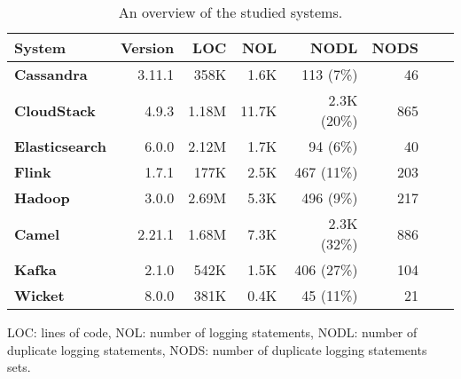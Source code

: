 \begin{table}
    \caption{An overview of the studied systems. }
    \vspace{-0.2cm}
    \centering
    \tabcolsep=6pt
    \begin{tabular}{lrrrrrrr}
        \toprule
        \textbf{System}& \textbf{Version}  & \textbf{LOC} & \textbf{NOL} &
        \textbf{NODL} & \textbf{NODS} \\
        \midrule
        \textbf{Cassandra} & 3.11.1  & 358K & 1.6K &  113 (7\%)& 46 \\
        \textbf{CloudStack} & 4.9.3  & 1.18M & 11.7K &  2.3K (20\%)& 865 \\
        \textbf{Elasticsearch} & 6.0.0  & 2.12M & 1.7K & 94 (6\%)& 40 \\
        \textbf{Flink} & 1.7.1  & 177K & 2.5K &  467 (11\%)& 203 \\
        \textbf{Hadoop} & 3.0.0  & 2.69M & 5.3K & 496 (9\%)& 217 \\

        \midrule
        \textbf{Camel} & 2.21.1  & 1.68M & 7.3K &  2.3K (32\%)& 886 \\
        \textbf{Kafka} & 2.1.0  & 542K & 1.5K &  406 (27\%)& 104 \\
        \textbf{Wicket} & 8.0.0 & 381K & 0.4K &  45 (11\%)& 21 \\
        \bottomrule
    \end{tabular}

    \noindent LOC: lines of code, NOL: number of logging statements, NODL: number of duplicate logging statements, NODS: number of duplicate logging statements sets.
    \vspace{-0.6cm}
    \label{table:systems}
\end{table}
